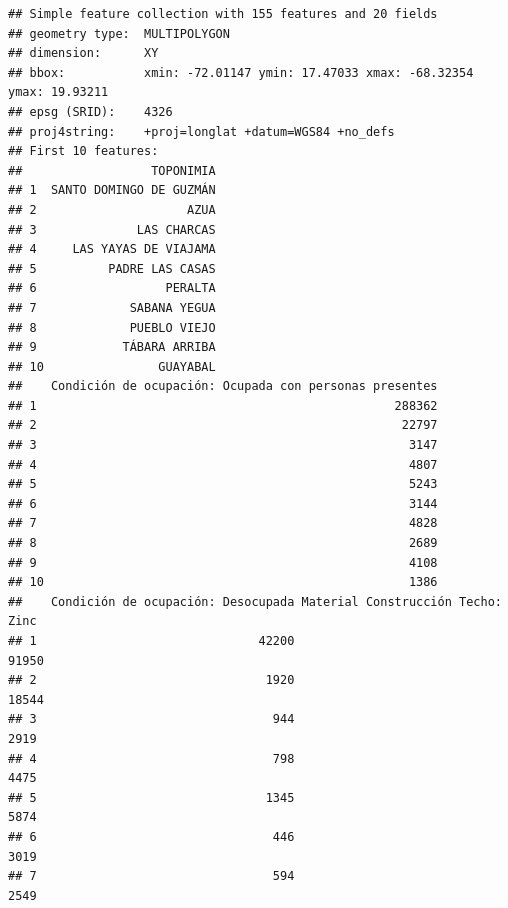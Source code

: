 \documentclass[11pt,]{article}
\newenvironment{Shaded}{\begin{snugshade}}{\end{snugshade}}
\newcommand{\KeywordTok}[1]{\textcolor[rgb]{0.13,0.29,0.53}{\textbf{#1}}}
\newcommand{\DataTypeTok}[1]{\textcolor[rgb]{0.13,0.29,0.53}{#1}}
\newcommand{\StringTok}[1]{\textcolor[rgb]{0.31,0.60,0.02}{#1}}
\newcommand{\OperatorTok}[1]{\textcolor[rgb]{0.81,0.36,0.00}{\textbf{#1}}}
\newcommand{\NormalTok}[1]{#1}
\begin{document}
\begin{Shaded}
\end{Shaded}

\begin{verbatim}
## Simple feature collection with 155 features and 20 fields
## geometry type:  MULTIPOLYGON
## dimension:      XY
## bbox:           xmin: -72.01147 ymin: 17.47033 xmax: -68.32354 ymax: 19.93211
## epsg (SRID):    4326
## proj4string:    +proj=longlat +datum=WGS84 +no_defs
## First 10 features:
##                  TOPONIMIA
## 1  SANTO DOMINGO DE GUZMÁN
## 2                     AZUA
## 3              LAS CHARCAS
## 4     LAS YAYAS DE VIAJAMA
## 5          PADRE LAS CASAS
## 6                  PERALTA
## 7             SABANA YEGUA
## 8             PUEBLO VIEJO
## 9            TÁBARA ARRIBA
## 10                GUAYABAL
##    Condición de ocupación: Ocupada con personas presentes
## 1                                                  288362
## 2                                                   22797
## 3                                                    3147
## 4                                                    4807
## 5                                                    5243
## 6                                                    3144
## 7                                                    4828
## 8                                                    2689
## 9                                                    4108
## 10                                                   1386
##    Condición de ocupación: Desocupada Material Construcción Techo: Zinc
## 1                               42200                             91950
## 2                                1920                             18544
## 3                                 944                              2919
## 4                                 798                              4475
## 5                                1345                              5874
## 6                                 446                              3019
## 7                                 594                              2549

\end{verbatim}
\end{document}
